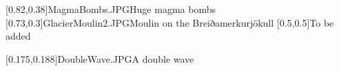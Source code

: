 



\graphicspath{{Figures/}{Figures/Iceland/}}


\subtitle{Day 4}
\date{29.10.2019}


    
    [0.82,0.38]{MagmaBombs.JPG}{Huge magma bombs}
    [0.73,0.3]{GlacierMoulin2.JPG}{Moulin on the Breiðamerkurj\"okull}
    [0.5,0.5]{}{To be added}
    
    [0.175,0.188]{DoubleWave.JPG}{A double wave}


